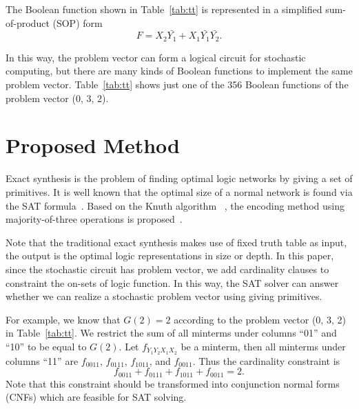 \documentclass[conference,letterpaper]{IEEEtran}
\begin{document}
The Boolean function shown in Table~\ref{tab:tt} is represented in a simplified sum-of-product (SOP) form
\begin{equation}
F=X_{2}\bar{Y_{1}}+X_{1} \bar{Y_{1}}\bar{Y_{2}}.
\end{equation}

In this way, the problem vector can form a logical circuit for stochastic computing, but there are many kinds of Boolean functions to implement the same problem vector. Table~\ref{tab:tt} shows just one of the 356 Boolean functions of the problem vector (0, 3, 2).


\section*{Proposed Method}
Exact synthesis is the problem of finding optimal logic networks by giving a set of primitives. 
It is well known that the optimal size of a normal network is found via the SAT formula~\cite{3}. Based on the Knuth algorithm ~\cite{4}, the encoding method using majority-of-three operations is proposed~\cite{6}. 

Note that the traditional exact synthesis makes use of fixed truth table as input, the output is the optimal logic representations in size or depth.
In this paper, since the stochastic circuit has problem vector, we add cardinality clauses to constraint the on-sets of logic function. In this way, the SAT solver can answer whether we can realize a stochastic problem vector using giving primitives. 

For example, we know that $G(2) = 2$ according to the problem vector (0, 3, 2) in Table~\ref{tab:tt}. We restrict the sum of all minterms under columns ``01'' and ``10'' to be equal to $G(2)$. 
Let $f_{Y_1Y_2X_1X_2}$ be a minterm, then all minterms under columns ``11''
are $f_{0011}$, $f_{0111}$, $f_{1011}$, and $f_{0011}$.
Thus the cardinality constraint is \vspace{-0.5ex}
\begin{equation}
f_{0011} + f_{0111} + f_{1011} + f_{0011} = 2.
\end{equation}
Note that this constraint should be transformed into conjunction normal forms (CNFs) which are feasible for SAT solving.
\end{document}

